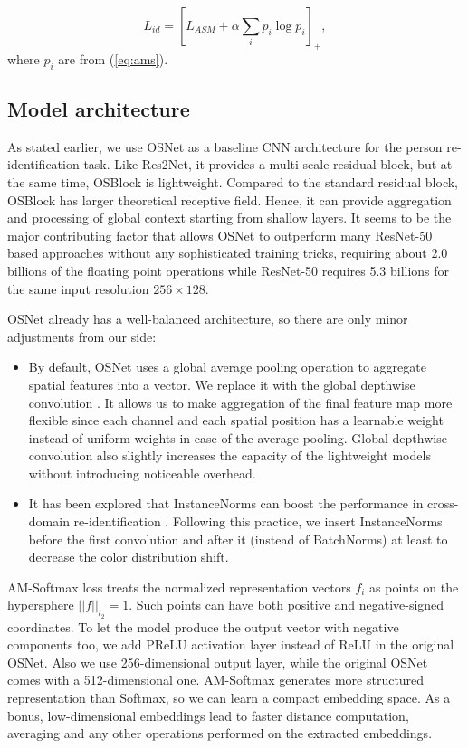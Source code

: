 \documentclass[a4paper,conference]{IEEEtran}
\begin{document}
\begin{equation}
  \label{eq:id_loss}
  L_{id} = [L_{ASM} + \alpha \sum_i p_i \log p_i]_+,
\end{equation}
where $p_i$ are from (\ref{eq:ams}).

\subsection{Model architecture}

As stated earlier, we use OSNet as a baseline CNN architecture for the person
re-identification task. Like Res2Net, it provides a multi-scale residual block,
but at the same time, OSBlock is lightweight.  Compared to the standard residual
block, OSBlock has larger theoretical receptive field. Hence, it can provide
aggregation and processing of global context starting from shallow layers. It
seems to be the major contributing factor that allows OSNet to outperform many
ResNet-50 based approaches \cite{zhou2019osnet} without any sophisticated
training tricks, requiring about 2.0 billions of the floating point operations
while ResNet-50 requires 5.3 billions for the same input resolution
$256\times128$.

OSNet already has a well-balanced architecture, so there are only minor
adjustments from our side:

\begin{itemize}
  \item By default, OSNet uses a global average pooling operation to aggregate
    spatial features into a vector. We replace it with the global depthwise
    convolution \cite{mobilefacenet}.  It allows us to make aggregation of the
    final feature map more flexible since each channel and each spatial position
    has a learnable weight instead of uniform weights in case of the average
    pooling.  Global depthwise convolution also slightly increases the capacity
    of the lightweight models without introducing noticeable overhead.

  \item It has been explored that InstanceNorms can boost the performance in
    cross-domain re-identification \cite{Jia2019FrustratinglyEP}. Following this
    practice, we insert InstanceNorms before the first convolution and after it
    (instead of BatchNorms) at least to decrease the color distribution shift.

\end{itemize}

AM-Softmax loss treats the normalized representation vectors $f_i$ as points on
the hypersphere $||f||_{l_2}=1$. Such points can have both positive and
negative-signed coordinates.  To let the model produce the output vector with
negative components too, we add PReLU activation layer instead of ReLU in the
original OSNet. Also we use 256-dimensional output layer, while the original
OSNet comes with a 512-dimensional one. AM-Softmax generates more structured
representation than Softmax, so we can learn a compact embedding space. As a
bonus, low-dimensional embeddings lead to faster distance computation, averaging
and any other operations performed on the extracted embeddings.
\end{document}
